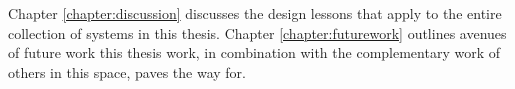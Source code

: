 Chapter \ref{chapter:discussion} discusses the design lessons that apply to the entire collection of systems in this thesis. Chapter \ref{chapter:futurework} outlines avenues of future work this thesis work, in combination with the complementary work of others in this space, paves the way for.

